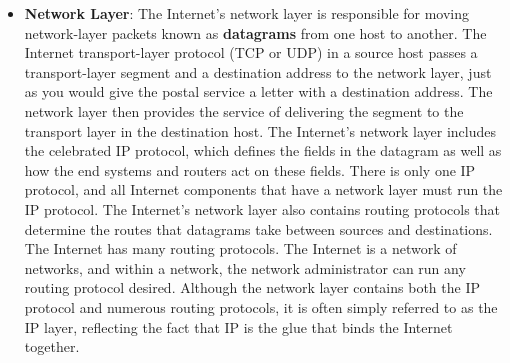 \documentclass{report}
\begin{document}
\begin{itemize}
            \bigbreak \noindent 
            TCP also breaks long messages into shorter segments and provides a congestion-control mechanism, so that a source throttles its transmission rate when the network is congested.
            \bigbreak \noindent 
            The UDP protocol provides a connectionless service to its applications. This is a no-frills service that provides no reliability, no flow control, and no congestion control. In this book, we’ll refer to a transport-layer packet as a \textbf{segment}.
            \bigbreak \noindent 
            \textbf{Note}: To throttle a transmission rate means to deliberately limit or slow down the speed at which data is sent or received over a network
            \bigbreak \noindent 
            Imagine an e-commerce website on Black Friday. Without a throttle, millions of users clicking "Buy Now" at the exact same millisecond would completely overwhelm the website's database. The server would run out of memory, crash, and the entire website would go offline for everyone. By implementing a rate limiter (throttle), the website's server sets a strict boundary—for example, a maximum of 10,000 requests per second.
            \bigbreak \noindent 
            Instead of the entire system crashing and ruining the experience for 100\% of the shoppers, the throttle keeps the website healthy and running smoothly by making a tiny fraction of users wait just an extra moment.
        \item \textbf{Network Layer}: The Internet’s network layer is responsible for moving network-layer packets known as \textbf{datagrams} from one host to another. The Internet transport-layer protocol (TCP or UDP) in a source host passes a transport-layer segment and a destination address to the network layer, just as you would give the postal service a letter with a destination address. The network layer then provides the service of delivering the segment to the transport layer in the destination host.
            \bigbreak \noindent 
            The Internet’s network layer includes the celebrated IP protocol, which defines the fields in the datagram as well as how the end systems and routers act on these fields. There is only one IP protocol, and all Internet components that have a network layer must run the IP protocol. The Internet’s network layer also contains routing protocols that determine the routes that datagrams take between sources and destinations. 
            \bigbreak \noindent 
            The Internet has many routing protocols. The Internet is a network of networks, and within a network, the network administrator can run any routing protocol desired. Although the network layer contains both the IP protocol and numerous routing protocols, it is often simply referred to as the IP layer, reflecting the fact that IP is the glue that binds the Internet together.

\end{itemize}
\end{document}
